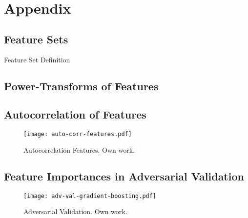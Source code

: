 \section{Appendix}


\subsection{Feature Sets}
\label{app:feature-sets}

\begin{table}[H]
    \centering
    
    \caption[Feature Set Definition]{Feature Set Definition}
    \label{tab:feature-set-definition}
\end{table}

\newpage

\newpage
\subsection{Power-Transforms of Features}
\label{app:power-transforms-of-features}

\newpage
\subsection{Autocorrelation of Features}
\label{app:autocorrelation-of-features}

\begin{figure}[ht]
    \centering
    \texttt{[image: auto-corr-features.pdf]}
    \caption[Autocorrelation Features]{Autocorrelation Features. Own work.}
    \label{fig:auto-correlation-features}
\end{figure}

\newpage
\subsection{Feature Importances in Adversarial Validation}
\label{app:feature-importances-adv-validation}
\begin{figure}[ht]
    \centering
    \texttt{[image: adv-val-gradient-boosting.pdf]}
    \caption[Adversarial Validation]{Adversarial Validation. Own work.}
    \label{fig:adv-validation}
\end{figure}


